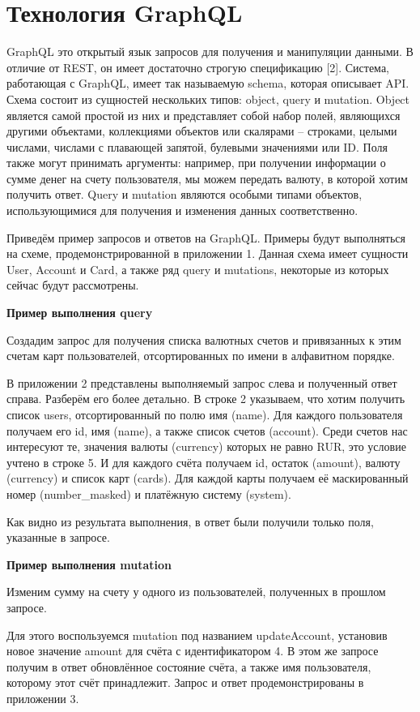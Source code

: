 \section{Технология GraphQL}\label{sec:graphql}

GraphQL это открытый язык запросов для получения и манипуляции данными.
В отличие от REST, он имеет достаточно строгую спецификацию [2].
Система, работающая с GraphQL, имеет так называемую schema, которая описывает API. Схема состоит из сущностей нескольких типов: object, query и mutation.
Object является самой простой из них и представляет собой набор полей, являющихся другими объектами, коллекциями объектов или скалярами – строками, целыми числами, числами с плавающей запятой, булевыми значениями или ID. Поля также могут принимать аргументы: например, при получении информации о сумме денег на счету пользователя, мы можем передать валюту, в которой хотим получить ответ.
Query и mutation являются особыми типами объектов, использующимися для получения и изменения данных соответственно.

Приведём пример запросов и ответов на GraphQL. Примеры будут выполняться на схеме, продемонстрированной в приложении 1.
Данная схема имеет сущности User, Account и Card, а также ряд query и mutations, некоторые из которых сейчас будут рассмотрены.

\textbf{Пример выполнения query}

Создадим запрос для получения списка валютных счетов и привязанных к этим счетам карт пользователей, отсортированных по имени в алфавитном порядке.

В приложении 2 представлены выполняемый запрос слева и полученный ответ справа.
Разберём его более детально.
В строке 2 указываем, что хотим получить список users, отсортированный по полю имя (name).
Для каждого пользователя получаем его id, имя (name), а также список счетов (account).
Среди счетов нас интересуют те, значения валюты (currency) которых не равно RUR, это условие учтено в строке 5.
И для каждого счёта получаем id, остаток (amount), валюту (currency) и список карт (cards).
Для каждой карты получаем её маскированный номер (number\_masked) и платёжную систему (system).

Как видно из результата выполнения, в ответ были получили только поля, указанные в запросе.

\textbf{Пример выполнения mutation}

Изменим сумму на счету у одного из пользователей, полученных в прошлом запросе.

Для этого воспользуемся mutation под названием updateAccount, установив новое значение amount для счёта с идентификатором 4.
В этом же запросе получим в ответ обновлённое состояние счёта, а также имя пользователя, которому этот счёт принадлежит.
Запрос и ответ продемонстрированы в приложении 3.


